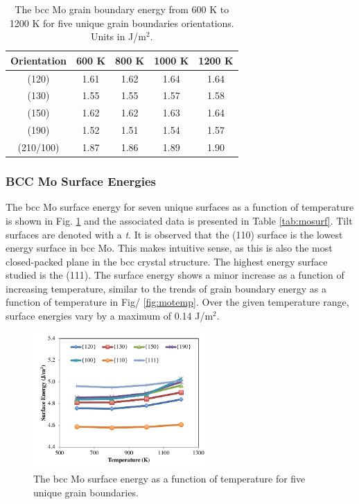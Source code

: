 \documentclass[review]{elsarticle}
\begin{document}
\FloatBarrier

\begin{table}[h]
\caption{The bcc Mo grain boundary energy from 600 K to 1200 K for five unique grain boundaries orientations. Units in J/m$^{2}$. } \label{tab:motemp}
\begin{center}
\begin{tabular}{|c|c|c|c|c|}
	\hline
	Orientation & 600 K & 800 K & 1000 K & 1200 K \\
	 \hline
	 (120) & 1.61 & 1.62 & 1.64 & 1.64 \\
	 (130) & 1.55 & 1.55 & 1.57 & 1.58 \\
	 (150) & 1.62 & 1.62 & 1.63 & 1.64 \\
	 (190) & 1.52 & 1.51 & 1.54 & 1.57 \\
	 (210/100) & 1.87 & 1.86 & 1.89 & 1.90 \\	 
	 \hline
\end{tabular}
\end{center}
\label{default}
\end{table}

\FloatBarrier

\subsubsection{BCC Mo Surface Energies}

The bcc Mo surface energy for seven unique surfaces as a function of temperature is shown in Fig. \ref{fig:mosurf} and the associated data is presented in Table \ref{tab:mosurf}. Tilt surfaces are denoted with a \textit{t}. It is observed that the (110) surface is the lowest energy surface in bcc Mo. This makes intuitive sense, as this is also the most closed-packed plane in the bcc crystal structure. The highest energy surface studied is the (111). The surface energy shows a minor increase as a function of increasing temperature, similar to the trends of grain boundary energy as a function of temperature in Fig/ \ref{fig:motemp}. Over the given temperature range, surface energies vary by a maximum of 0.14 J/m$^{2}$.

\begin{figure}[h]
 \centering
 \includegraphics[width=0.6\textwidth]{mosurf.png}
 \caption{The bcc Mo surface energy as a function of temperature for five unique grain boundaries.}
 \label{fig:mosurf}
\end{figure}
\end{document}
